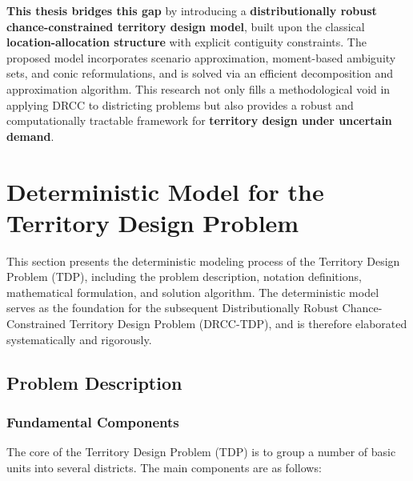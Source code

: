 \documentclass[preprint,12pt,authoryear]{elsarticle}
\begin{document}
\textbf{This thesis bridges this gap} by introducing a \textbf{distributionally robust chance-constrained territory design model}, built upon the classical \textbf{location-allocation structure} with explicit contiguity constraints. The proposed model incorporates scenario approximation, moment-based ambiguity sets, and conic reformulations, and is solved via an efficient decomposition and approximation algorithm. This research not only fills a methodological void in applying DRCC to districting problems but also provides a robust and computationally tractable framework for \textbf{territory design under uncertain demand}.


\section{Deterministic Model for the Territory Design Problem}

This section presents the deterministic modeling process of the Territory Design Problem (TDP), including the problem description, notation definitions, mathematical formulation, and solution algorithm. 
The deterministic model serves as the foundation for the subsequent Distributionally Robust Chance-Constrained Territory Design Problem (DRCC-TDP), and is therefore elaborated systematically and rigorously.

\subsection{Problem Description}

\subsubsection{Fundamental Components}

The core of the Territory Design Problem (TDP) is to group a number of basic units into several districts. The main components are as follows:
\end{document}
